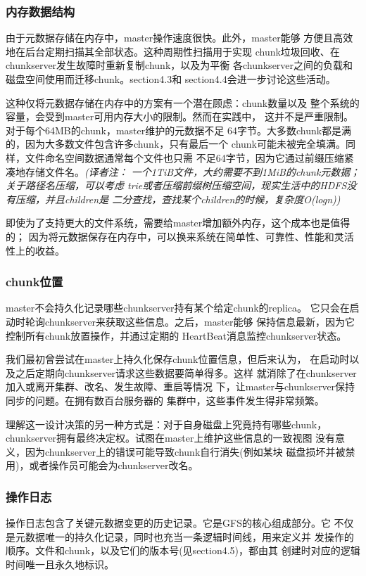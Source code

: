 \subsubsection{内存数据结构}
由于元数据存储在内存中，master操作速度很快。此外，master能够
方便且高效地在后台定期扫描其全部状态。这种周期性扫描用于实现
chunk垃圾回收、在chunkserver发生故障时重新复制chunk，以及为平衡
各chunkserver之间的负载和磁盘空间使用而迁移chunk。section4.3和
section4.4会进一步讨论这些活动。

这种仅将元数据存储在内存中的方案有一个潜在顾虑：chunk数量以及
整个系统的容量，会受到master可用内存大小的限制。然而在实践中，
这并不是严重限制。对于每个64MB的chunk，master维护的元数据不足
64字节。大多数chunk都是满的，因为大多数文件包含许多chunk，只有最后一个
chunk可能未被完全填满。同样，文件命名空间数据通常每个文件也只需
不足64字节，因为它通过前缀压缩紧凑地存储文件名。\emph{(译者注：
一个1TiB文件，大约需要不到1MiB的chunk元数据；关于路径名压缩，可以考虑
trie或者压缩前缀树压缩空间，现实生活中的HDFS没有压缩，并且children是
二分查找，查找某个children的时候，复杂度O(logn))}

即使为了支持更大的文件系统，需要给master增加额外内存，这个成本也是值得的；
因为将元数据保存在内存中，可以换来系统在简单性、可靠性、性能和灵活性上的收益。

\subsubsection{chunk位置}
master不会持久化记录哪些chunkserver持有某个给定chunk的replica。
它只会在启动时轮询chunkserver来获取这些信息。之后，master能够
保持信息最新，因为它控制所有chunk放置操作，并通过定期的
HeartBeat消息监控chunkserver状态。

我们最初曾尝试在master上持久化保存chunk位置信息，但后来认为，
在启动时以及之后定期向chunkserver请求这些数据要简单得多。这样
就消除了在chunkserver加入或离开集群、改名、发生故障、重启等情况
下，让master与chunkserver保持同步的问题。在拥有数百台服务器的
集群中，这些事件发生得非常频繁。

理解这一设计决策的另一种方式是：对于自身磁盘上究竟持有哪些chunk，
chunkserver拥有最终决定权。试图在master上维护这些信息的一致视图
没有意义，因为chunkserver上的错误可能导致chunk自行消失(例如某块
磁盘损坏并被禁用)，或者操作员可能会为chunkserver改名。

\subsubsection{操作日志}
操作日志包含了关键元数据变更的历史记录。它是GFS的核心组成部分。它
不仅是元数据唯一的持久化记录，同时也充当一条逻辑时间线，用来定义并
发操作的顺序。文件和chunk，以及它们的版本号(见section4.5)，都由其
创建时对应的逻辑时间唯一且永久地标识。


